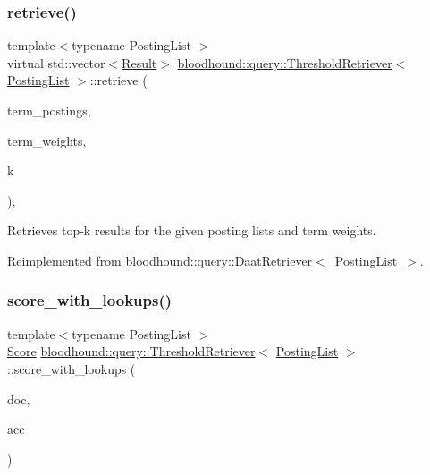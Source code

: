 \subsubsection{\texorpdfstring{retrieve()}{retrieve()}}
{\footnotesize\ttfamily template$<$typename Posting\+List $>$ \\
virtual std\+::vector$<$\mbox{\hyperlink{structbloodhound_1_1query_1_1Result}{Result}}$>$ \mbox{\hyperlink{classbloodhound_1_1query_1_1ThresholdRetriever}{bloodhound\+::query\+::\+Threshold\+Retriever}}$<$ \mbox{\hyperlink{classbloodhound_1_1PostingList}{Posting\+List}} $>$\+::retrieve (\begin{DoxyParamCaption}\item[{const std\+::vector$<$ \mbox{\hyperlink{classbloodhound_1_1PostingList}{Posting\+List}} $>$ \&}]{term\+\_\+postings,  }\item[{const std\+::vector$<$ \mbox{\hyperlink{structbloodhound_1_1Score}{Score}} $>$ \&}]{term\+\_\+weights,  }\item[{std\+::size\+\_\+t}]{k }\end{DoxyParamCaption})\hspace{0.3cm}{\ttfamily [inline]}, {\ttfamily [virtual]}}



Retrieves top-\/k results for the given posting lists and term weights. 



Reimplemented from \mbox{\hyperlink{classbloodhound_1_1query_1_1DaatRetriever_ab80b4867fc263827dc2fdbe0965a2e8c}{bloodhound\+::query\+::\+Daat\+Retriever$<$ Posting\+List $>$}}.

\mbox{\label{classbloodhound_1_1query_1_1ThresholdRetriever_ac0a8731d270c477e04f24b89850a7d4a}} 
\subsubsection{\texorpdfstring{score\+\_\+with\+\_\+lookups()}{score\_with\_lookups()}}
{\footnotesize\ttfamily template$<$typename Posting\+List $>$ \\
\mbox{\hyperlink{structbloodhound_1_1Score}{Score}} \mbox{\hyperlink{classbloodhound_1_1query_1_1ThresholdRetriever}{bloodhound\+::query\+::\+Threshold\+Retriever}}$<$ \mbox{\hyperlink{classbloodhound_1_1PostingList}{Posting\+List}} $>$\+::score\+\_\+with\+\_\+lookups (\begin{DoxyParamCaption}\item[{\mbox{\hyperlink{structbloodhound_1_1Doc}{Doc}}}]{doc,  }\item[{std\+::vector$<$ \mbox{\hyperlink{structbloodhound_1_1Score}{Score}} $>$ \&}]{acc }\end{DoxyParamCaption})\hspace{0.3cm}{\ttfamily [inline]}}

